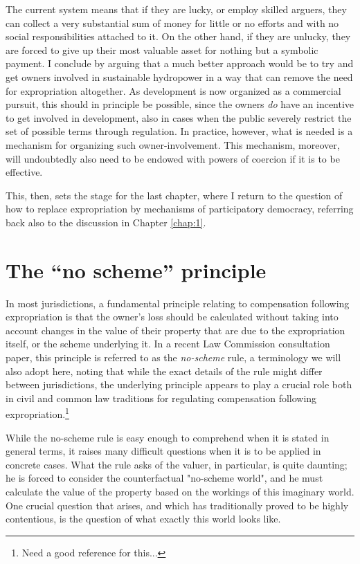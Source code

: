 The current system means that if they are lucky, or employ skilled arguers, they can collect a very substantial sum of money for little or no efforts and with no social responsibilities attached to it. On the other hand, if they are unlucky, they are forced to give up their most valuable asset for nothing but a symbolic payment. I conclude by arguing that a much better approach would be to try and get owners involved in sustainable hydropower in a way that can remove the need for expropriation altogether. As development is now organized as a commercial pursuit, this should in principle be possible, since the owners {\it do} have an incentive to get involved in  development, also in cases when the public severely restrict the set of possible terms through regulation.  In practice, however, what is needed is a mechanism for organizing such owner-involvement. This mechanism, moreover, will undoubtedly also need to be endowed with powers of coercion if it is to be effective.

This, then, sets the stage for the last chapter, where I return to the question of how to replace expropriation by mechanisms of participatory democracy, referring back also to the discussion in Chapter \ref{chap:1}.

\section{The ``no scheme'' principle}\label{sec:nsp}

In most jurisdictions, a fundamental principle relating to compensation following expropriation is that the owner's loss should be calculated without taking into account changes in the value of their property that are due to the expropriation itself, or the scheme underlying it. In a recent Law Commission consultation paper, this principle is referred to as the \emph{no-scheme} rule, a terminology we will also adopt here, noting that while the exact details of the rule might differ between jurisdictions, the underlying principle appears to play a crucial role both in civil and common law traditions for regulating compensation following expropriation.\footnote{Need a good reference for this...}

While the no-scheme rule is easy enough to comprehend when it is stated in general terms, it raises many difficult questions when it is to be applied in concrete cases. What the rule asks of the valuer, in particular, is quite daunting; he is forced to consider the counterfactual "no-scheme world", and he must calculate the value of the property based on the workings of this imaginary world. One crucial question that arises, and which has traditionally proved to be highly contentious, is the question of what exactly this world looks like.

